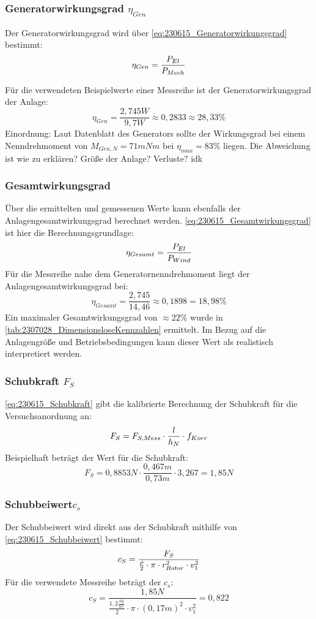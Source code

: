 \subsubsection*{Generatorwirkungsgrad $\eta_{Gen}$}
Der Generatorwirkungsgrad wird über \autoref{eq:230615_Generatorwirkungsgrad} bestimmt:
\begin{equation}
    \centering
    \eta_{Gen} = \frac{P_{El}}{P_{Mech}}
    \label{eq:230615_Generatorwirkungsgrad}
\end{equation}

Für die verwendeten Beispielwerte einer Messreihe ist der Generatorwirkungsgrad der Anlage:
$$\eta_{Gen} = \frac{2,745W}{9,7W} \approx 0,2833 \approx 28,33\% $$
Einordnung:
Laut Datenblatt des Generators sollte der Wirkungsgrad bei einem Nenndrehmoment von $M_{Gen,N}= 71 mNm$ bei $\eta_{max}=83\%$ liegen.
Die Abweichung ist wie zu erklären? Größe der Anlage? Verluste? idk
\subsubsection*{Gesamtwirkungsgrad}
Über die ermittelten und gemessenen Werte kann ebenfalls der Anlagengesamtwirkungsgrad berechnet werden.
\autoref{eq:230615_Gesamtwirkungsgrad} ist hier die Berechnungsgrundlage:
\begin{equation}
    \centering
    \eta_{Gesamt} = \frac{P_{El}}{P_{Wind}}
    \label{eq:230615_Gesamtwirkungsgrad}
\end{equation}
Für die Messreihe nahe dem Generatornenndrehmoment liegt der Anlagengesamtwirkungsgrad bei:
$$\eta_{Gesamt} = \frac{2,745}{14,46}\approx 0,1898 = 18,98\%$$
Ein maximaler Gesamtwirkungsgrad von $\approx 22\%$ wurde in \autoref{tab:2307028_DimensionsloseKennzahlen} ermittelt.
Im Bezug auf die Anlagengröße und Betriebsbedingungen kann dieser Wert als realistisch interpretiert werden.
\subsubsection*{Schubkraft $F_S$}
\autoref{eq:230615_Schubkraft} gibt die kalibrierte Berechnung der Schubkraft für die Versuchsanordnung an:
\begin{equation}
    \centering
    F_S = F_{S,Mess} \cdot \frac{l}{h_N} \cdot f_{Korr}
    \label{eq:230615_Schubkraft}
\end{equation}
Beispielhaft beträgt der Wert für die Schubkraft:
$$F_S = 0,8853N \cdot \frac{0,467m}{0,73m} \cdot 3,267 = 1,85N$$
\subsubsection*{Schubbeiwert$c_s$}
Der Schubbeiwert wird direkt aus der Schubkraft mithilfe von \autoref{eq:230615_Schubbeiwert} bestimmt:
\begin{equation}
    \centering
    c_S = \frac{F_S}{\frac{\rho}{2} \cdot \pi \cdot r_{Rotor}^2 \cdot v_1^2}
    \label{eq:230615_Schubbeiwert}
\end{equation}
Für die verwendete Messreihe beträgt der $c_s$:
$$c_S = \frac{1,85N}{\frac{1,2 \frac{kg}{m^3}}{2} \cdot \pi \cdot (0,17 m)^2 \cdot v_1^2} = 0,822$$

